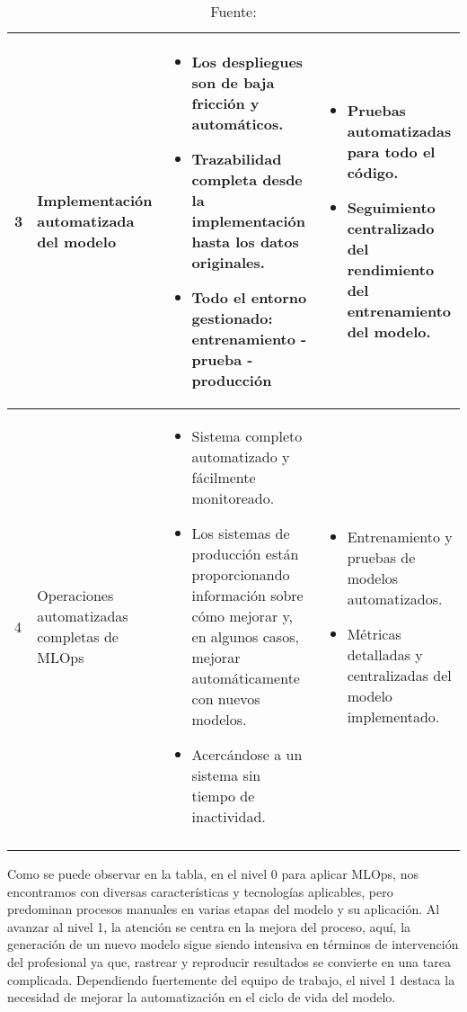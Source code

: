 \begin{longtable}{|p{2cm}|p{3cm}|p{5cm}|p{5cm}|}
        \hline
        3 & Implementación automatizada del modelo & \begin{itemize}\item Los despliegues son de baja fricción y automáticos. \item Trazabilidad completa desde la implementación hasta los datos originales. \item Todo el entorno gestionado: entrenamiento - prueba - producción\end{itemize} & \begin{itemize}\item Pruebas automatizadas para todo el código. \item Seguimiento centralizado del rendimiento del entrenamiento del modelo.\end{itemize} \\
        \hline
        4 & Operaciones automatizadas completas de MLOps & \begin{itemize}\item Sistema completo automatizado y fácilmente monitoreado. \item Los sistemas de producción están proporcionando información sobre cómo mejorar y, en algunos casos, mejorar automáticamente con nuevos modelos. \item Acercándose a un sistema sin tiempo de inactividad.\end{itemize} & \begin{itemize}\item Entrenamiento y pruebas de modelos automatizados. \item Métricas detalladas y centralizadas del modelo implementado.\end{itemize} \\
    \hline
    \caption*{\footnotesize Fuente: \cite{microsoft2023}}
    \label{tab:tabFlujoTrabajo}
\end{longtable}

\newpage

Como se puede observar en la tabla, en el nivel 0 para aplicar MLOps, nos encontramos con diversas características y tecnologías aplicables, pero predominan procesos manuales en varias etapas del modelo y su aplicación. Al avanzar al nivel 1, la atención se centra en la mejora del proceso, aquí, la generación de un nuevo modelo sigue siendo intensiva en términos de intervención del profesional ya que, rastrear y reproducir resultados se convierte en una tarea complicada. Dependiendo fuertemente del equipo de trabajo, el nivel 1 destaca la necesidad de mejorar la automatización en el ciclo de vida del modelo. \newline

